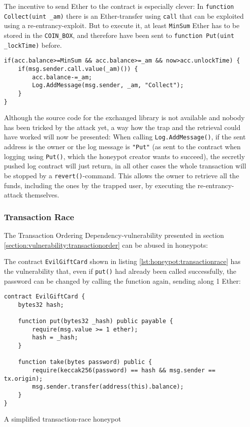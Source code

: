The incentive to send Ether to the contract is especially clever: In \texttt{function Collect(uint _am)} there is an Ether-transfer using \texttt{call} that can be exploited using a re-entrancy-exploit. But to execute it, at least \texttt{MinSum} Ether has to be stored in the \texttt{COIN_BOX}, and therefore have been sent to \texttt{function Put(uint _lockTime)} before.
\begin{verbatim}
if(acc.balance>=MinSum && acc.balance>=_am && now>acc.unlockTime) {
    if(msg.sender.call.value(_am)()) {
        acc.balance-=_am;
        Log.AddMessage(msg.sender, _am, "Collect");
    }
}
\end{verbatim}

Although the source code for the exchanged library is not available and nobody has been tricked by the attack yet, a way how the trap and the retrieval could have worked will now be presented: When calling \texttt{Log.AddMessage()}, if the sent address is the owner or the log message is \texttt{"Put"} (as sent to the contract when logging using \texttt{Put()}, which the honeypot creator wants to succeed), the secretly pushed log contract will just return, in all other cases the whole transaction will be stopped by a \texttt{revert()}-command. This allows the owner to retrieve all the funds, including the ones by the trapped user, by executing the re-entrancy-attack themselves.

\subsubsection{Transaction Race}
\label{section:honeypots:transactionordering}
The Transaction Ordering Dependency-vulnerability presented in section \ref{section:vulnerability:transactionorder} can be abused in honeypots:

The contract \texttt{EvilGiftCard} shown in listing \ref{lst:honeypot:transactionrace} has the vulnerability that, even if \texttt{put()} had already been called successfully, the password can be changed by calling the function again, sending along 1 Ether:
\begin{listing}[H]
	\begin{verbatim}
contract EvilGiftCard {
    bytes32 hash;
    
    function put(bytes32 _hash) public payable {
        require(msg.value >= 1 ether);
        hash = _hash;
    }
    
    function take(bytes password) public {
        require(keccak256(password) == hash && msg.sender == tx.origin);
        msg.sender.transfer(address(this).balance);
    }
}
    \end{verbatim}
	\caption{A simplified transaction-race honeypot}
	\label{lst:honeypot:transactionrace}
\end{listing}

